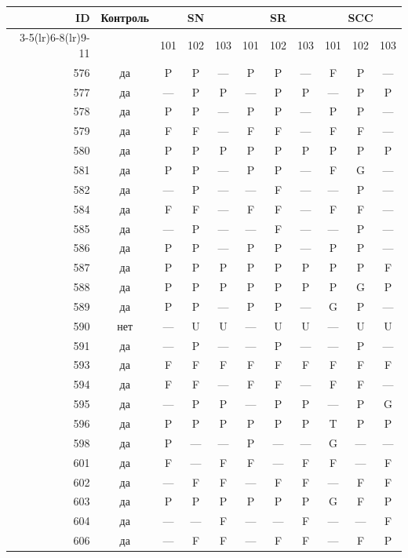 \begin{table}[p]\centering\small
\begin{tabular*}{\textwidth}{@{\extracolsep{\fill}}rc*{9}{c}@{}}\toprule
ID & Контроль & \multicolumn{3}{c}{SN} & \multicolumn{3}{c}{SR} & \multicolumn{3}{c}{SCC}\\
\cmidrule(lr){3-5}\cmidrule(lr){6-8}\cmidrule(lr){9-11}
 & & 101 & 102 & 103 & 101 & 102 & 103 & 101 & 102 & 103\\\midrule
576 & да & P & P & — & P & P & — & F & P & —\\
577 & да & — & P & P & — & P & P & — & P & P\\
578 & да & P & P & — & P & P & — & P & P & —\\
579 & да & F & F & — & F & F & — & F & F & —\\
580 & да & P & P & P & P & P & P & P & P & P\\
581 & да & P & P & — & P & P & — & F & G & —\\
582 & да & — & P & — & — & F & — & — & P & —\\
584 & да & F & F & — & F & F & — & F & F & —\\
585 & да & — & P & — & — & F & — & — & P & —\\
586 & да & P & P & — & P & P & — & P & P & —\\
587 & да & P & P & P & P & P & P & P & P & F\\
588 & да & P & P & P & P & P & P & P & G & P\\
589 & да & P & P & — & P & P & — & G & P & —\\
590 & нет & — & U & U & — & U & U & — & U & U\\
591 & да & — & P & — & — & P & — & — & P & —\\
593 & да & F & F & F & F & F & F & F & F & F\\
594 & да & F & F & — & F & F & — & F & F & —\\
595 & да & — & P & P & — & P & P & — & P & G\\
596 & да & P & P & P & P & P & P & T & P & P\\
598 & да & P & — & — & P & — & — & G & — & —\\
601 & да & F & — & F & F & — & F & F & — & F\\
602 & да & — & F & F & — & F & F & — & F & F\\
603 & да & P & P & P & P & P & P & G & F & P\\
604 & да & — & — & F & — & — & F & — & — & F\\
606 & да & — & F & F & — & F & F & — & F & P\\

\end{tabular*}
\end{table}
